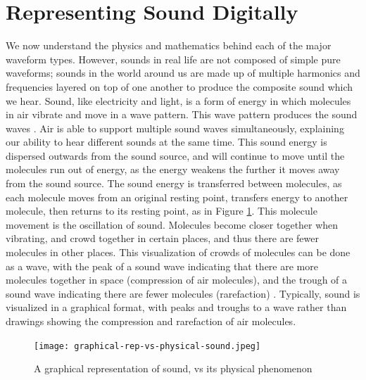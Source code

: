 \section{Representing Sound Digitally}

We now understand the physics and mathematics behind each of the major waveform types. However, sounds in real life are not composed of simple pure waveforms; sounds in the world around us are made up of multiple harmonics and frequencies layered on top of one another to produce the composite sound which we hear. Sound, like electricity and light, is a form of energy in which molecules in air vibrate and move in a wave pattern. This wave pattern produces the sound waves \cite{Au-Yeung_2021}. Air is able to support multiple sound waves simultaneously, explaining our ability to hear different sounds at the same time. This sound energy is dispersed outwards from the sound source, and will continue to move until the molecules run out of energy, as the energy weakens the further it moves away from the sound source. The sound energy is transferred between molecules, as each molecule moves from an original resting point, transfers energy to another molecule, then returns to its resting point, as in Figure \ref{fig:graphical-rep-vs-physical-sound}. This molecule movement is the oscillation of sound. Molecules become closer together when vibrating, and crowd together in certain places, and thus there are fewer molecules in other places. This visualization of crowds of molecules can be done as a wave, with the peak of a sound wave indicating that there are more molecules together in space (compression of air molecules), and the trough of a sound wave indicating there are fewer molecules (rarefaction) \cite{Toft_2020}. Typically, sound is visualized in a graphical format, with peaks and troughs to a wave rather than drawings showing the compression and rarefaction of air molecules. 

\begin{figure}
  \centering
  \texttt{[image: graphical-rep-vs-physical-sound.jpeg]}
  \caption{A graphical representation of sound, vs its physical phenomenon}\cite{Toft_2020}
  \label{fig:graphical-rep-vs-physical-sound}
\end{figure}

